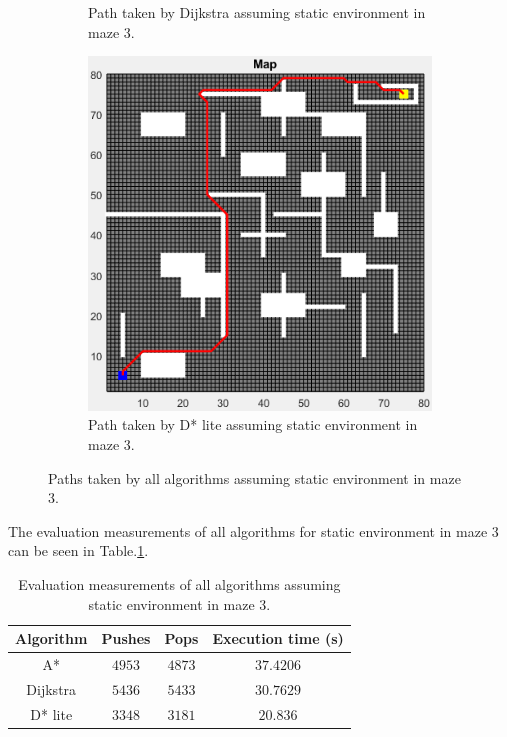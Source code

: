 \begin{figure}
\begin{subfigure}[t]{0.32\columnwidth}
		\caption{Path taken by Dijkstra assuming static environment in maze 3.}
        \label{fig:dijkstra_static_path_maze_3}
	\end{subfigure}
    \hfill
    \begin{subfigure}[t]{0.32\columnwidth}
		\centering
		\includegraphics[width=\textwidth]{images/d_star_lite_static_maze_3.png}
		\caption{Path taken by D* lite assuming static environment in maze 3.}
        \label{fig:d_star_static_path_maze_3}
	\end{subfigure}
	\caption{Paths taken by all algorithms assuming static environment in maze 3.}
    \label{fig:static_path_maze_3}
\end{figure}

The evaluation measurements of all algorithms for static environment in maze 3 can be seen in Table.\:\ref{tab:metric_static_maze_3}.

\begin{table}
    \centering
    \begin{tabular}{c|c|c|c}
        Algorithm   & Pushes    & Pops      & Execution time (s)    \\ \hline
        A*          & $4953$    & $4873$    & $37.4206$             \\
        Dijkstra    & $5436$    & $5433$    & $30.7629$             \\
        D* lite     & $3348$    & $3181$    & $20.836$
    \end{tabular}
    \caption{Evaluation measurements of all algorithms assuming static environment in maze 3.}
    \label{tab:metric_static_maze_3}
\end{table}

